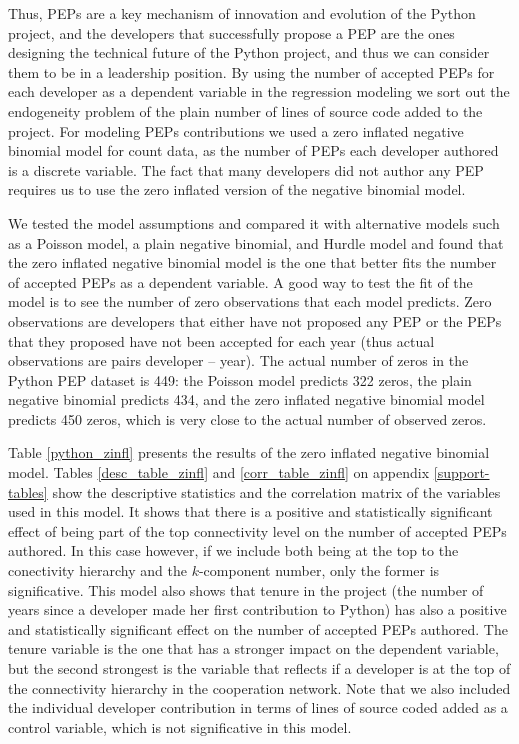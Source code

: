 Thus, PEPs are a key mechanism of innovation and evolution of the Python project, and the developers that successfully propose a PEP are the ones designing the technical future of the Python project, and thus we can consider them to be in a leadership position. By using the number of accepted PEPs for each developer as a dependent variable in the regression modeling we sort out the endogeneity problem of the plain number of lines of source code added to the project. For modeling PEPs contributions we used a zero inflated negative binomial model for count data, as the number of PEPs each developer authored is a discrete variable. The fact that many developers did not author any PEP requires us to use the zero inflated version of the negative binomial model.

We tested the model assumptions and compared it with alternative models such as a Poisson model, a plain negative binomial, and Hurdle model and found that the zero inflated negative binomial model is the one that better fits the number of accepted PEPs as a dependent variable. A good way to test the fit of the model is to see the number of zero observations that each model predicts. Zero observations are developers that either have not proposed any PEP or the PEPs that they proposed have not been accepted for each year (thus actual observations are pairs developer -- year). The actual number of zeros in the Python PEP dataset is 449: the Poisson model predicts 322 zeros, the plain negative binomial predicts 434, and the zero inflated negative binomial model predicts 450 zeros, which is very close to the actual number of observed zeros.

Table \ref{python_zinfl} presents the results of the zero inflated negative binomial model. Tables \ref{desc_table_zinfl} and \ref{corr_table_zinfl} on appendix \ref{support-tables} show the descriptive statistics and the correlation matrix of the variables used in this model. It shows that there is a positive and statistically significant effect of being part of the top connectivity level on the number of accepted PEPs authored. In this case however, if we include both being at the top to the conectivity hierarchy and the $k$-component number, only the former is significative. This model also shows that tenure in the project (the number of years since a developer made her first contribution to Python) has also a positive and statistically significant effect on the number of accepted PEPs authored. The tenure variable is the one that has a stronger impact on the dependent variable, but the second strongest is the variable that reflects if a developer is at the top of the connectivity hierarchy in the cooperation network. Note that we also included the individual developer contribution in terms of lines of source coded added as a control variable, which is not significative in this model. 

